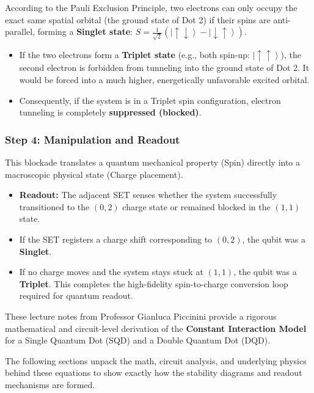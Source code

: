 \documentclass[
]{article}
\providecommand{\tightlist}{%
  \setlength{\itemsep}{0pt}\setlength{\parskip}{0pt}}
\begin{document}
According to the Pauli Exclusion Principle, two electrons can only
occupy the exact same spatial orbital (the ground state of Dot 2) if
their spins are anti-parallel, forming a \textbf{Singlet state}:
\(S = \frac{1}{\sqrt{2}}(\left|\uparrow\downarrow\right\rangle - \left|\downarrow\uparrow\right\rangle)\).

\begin{itemize}
\tightlist
\item
  If the two electrons form a \textbf{Triplet state} (e.g., both
  spin-up: \(\left|\uparrow\uparrow\right\rangle\)), the second electron
  is forbidden from tunneling into the ground state of Dot 2. It would
  be forced into a much higher, energetically unfavorable excited
  orbital.
\item
  Consequently, if the system is in a Triplet spin configuration,
  electron tunneling is completely \textbf{suppressed (blocked)}.
\end{itemize}

\subsubsection{Step 4: Manipulation and
Readout}\label{step-4-manipulation-and-readout}

This blockade translates a quantum mechanical property (Spin) directly
into a macroscopic physical state (Charge placement).

\begin{itemize}
\tightlist
\item
  \textbf{Readout:} The adjacent SET senses whether the system
  successfully transitioned to the \((0,2)\) charge state or remained
  blocked in the \((1,1)\) state.
\item
  If the SET registers a charge shift corresponding to \((0,2)\), the
  qubit was a \textbf{Singlet}.
\item
  If no charge moves and the system stays stuck at \((1,1)\), the qubit
  was a \textbf{Triplet}. This completes the high-fidelity
  spin-to-charge conversion loop required for quantum readout.
\end{itemize}

These lecture notes from Professor Gianluca Piccinini provide a rigorous
mathematical and circuit-level derivation of the \textbf{Constant
Interaction Model} for a Single Quantum Dot (SQD) and a Double Quantum
Dot (DQD).

The following sections unpack the math, circuit analysis, and underlying
physics behind these equations to show exactly how the stability
diagrams and readout mechanisms are formed.
\end{document}
